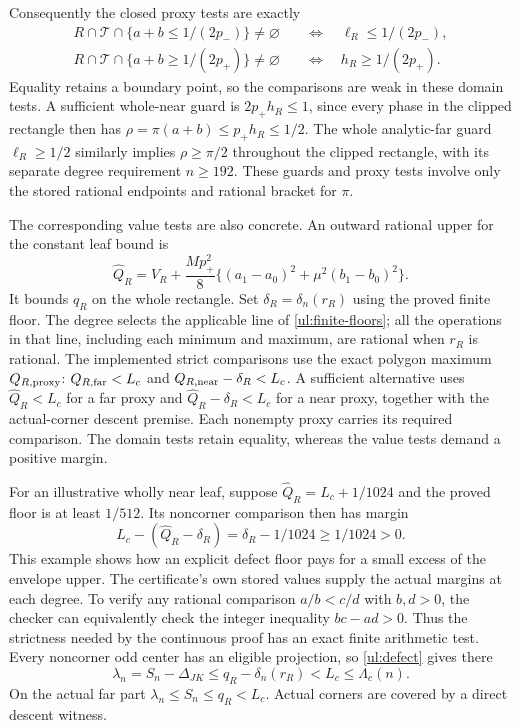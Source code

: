 Consequently the closed proxy tests are exactly
\[
 \begin{aligned}
 R\cap\mathcal T\cap\{a+b\leq1/(2p_-)\}\ne\varnothing
       &\quad\Longleftrightarrow\quad \ell_R\leq1/(2p_-),\\
 R\cap\mathcal T\cap\{a+b\geq1/(2p_+)\}\ne\varnothing
       &\quad\Longleftrightarrow\quad h_R\geq1/(2p_+).
 \end{aligned}
\]
Equality retains a boundary point, so the comparisons are weak in
these domain tests. A sufficient whole-near guard is
$2p_+h_R\leq1$, since every phase in the clipped rectangle then
has $\rho=\pi(a+b)\leq p_+h_R\leq1/2$. The whole analytic-far
guard $\ell_R\geq1/2$ similarly implies
$\rho\geq\pi/2$ throughout the clipped rectangle, with its
separate degree requirement $n\geq192$. These guards and proxy
tests involve only the stored rational endpoints and rational
bracket for $\pi$.

The corresponding value tests are also concrete. An outward rational
upper for the constant leaf bound is
\[
 \widehat Q_R=V_R+\frac{Mp_+^2}{8}
       \{(a_1-a_0)^2+\mu^2(b_1-b_0)^2\}.
\]
It bounds $q_R$ on the whole rectangle. Set
$\delta_R=\delta_n(r_R)$ using the proved finite floor.
The degree selects the applicable line of \eqref{ul:finite-floors};
all the operations in that line, including each minimum and maximum,
are rational when $r_R$ is rational. The implemented strict comparisons use the exact polygon maximum
$Q_{R,{\rm proxy}}$: $Q_{R,{\rm far}}<L_c$ and
$Q_{R,{\rm near}}-\delta_R<L_c$. A sufficient alternative uses
$\widehat Q_R<L_c$ for a far proxy and
$\widehat Q_R-\delta_R<L_c$ for a near proxy, together with the
actual-corner descent premise. Each nonempty proxy carries its
required comparison. The domain tests retain equality, whereas the
value tests demand a positive margin.

For an illustrative wholly near leaf, suppose
$\widehat Q_R=L_c+1/1024$ and the proved floor is at least
$1/512$. Its noncorner comparison then has margin
\[
 L_c-(\widehat Q_R-\delta_R)
          =\delta_R-1/1024\geq1/1024>0.
\]
This example shows how an explicit defect floor pays for a small
excess of the envelope upper. The certificate's own stored values
supply the actual margins at each degree. To verify any rational
comparison $a/b<c/d$ with $b,d>0$, the checker can equivalently
check the integer inequality $bc-ad>0$. Thus the strictness needed
by the continuous proof has an exact finite arithmetic test.
Every noncorner odd center has an eligible
projection, so \eqref{ul:defect} gives there
\[
 \lambda_n=S_n-\Delta_{JK}\leq q_R-\delta_n(r_R)<L_c
                                                   \leq\Lambda_c(n).
\]
On the actual far part $\lambda_n\leq S_n\leq q_R<L_c$.
Actual corners are covered by a direct descent witness.

